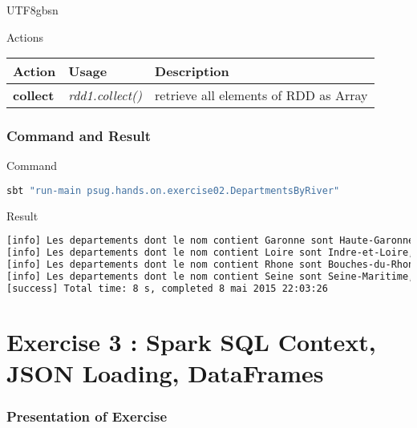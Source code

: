\documentclass[slidetop,9pt,utf8]{beamer}
\begin{document}
\begin{CJK}{UTF8}{gbsn}
\begin{frame}
  \begin{block}{Actions}
    \begin{center}
      \begin{tabular}{|m{2.1cm}|m{3.5cm}|m{5cm}|}
        \hline 
        \rowcolor{gray} \textbf{Action} & \textbf{Usage} & \textbf{Description} \\ \hline
        \textbf{collect} & \textit{rdd1.collect()} & retrieve all elements of RDD as Array \\ \hline
      \end{tabular}
    \end{center}
  \end{block}

\end{frame}

\begin{frame}[fragile]
  \frametitle{Command and Result}

  \begin{block}{Command}
    \begin{lstlisting}[language=bash, style=terminal]
sbt "run-main psug.hands.on.exercise02.DepartmentsByRiver"
    \end{lstlisting}
  \end{block}

  \begin{block}{Result}
    \begin{lstlisting}[language=bash, style=terminal]
[info] Les departements dont le nom contient Garonne sont Haute-Garonne, Lot-et-Garonne, Tarn-et-Garonne
[info] Les departements dont le nom contient Loire sont Indre-et-Loire, Loire, Haute-Loire, Loire-Atlantique, Loiret, Maine-et-Loire, Saone-et-Loire
[info] Les departements dont le nom contient Rhone sont Bouches-du-Rhone, Rhone
[info] Les departements dont le nom contient Seine sont Seine-Maritime, Seine-et-Marne, Hauts-de-Seine, Seine-Saint-Denis
[success] Total time: 8 s, completed 8 mai 2015 22:03:26
    \end{lstlisting}
  \end{block}

\end{frame}

\section{Exercise 3 : Spark SQL Context, JSON Loading, DataFrames}

\begin{frame}
  \frametitle{Presentation of Exercise}


\end{frame}
\end{CJK}
\end{document}
